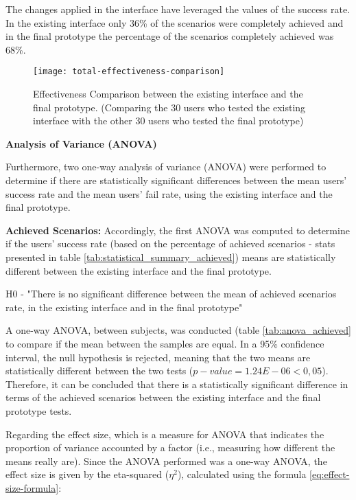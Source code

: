 The changes applied in the interface have leveraged the values of the success rate. In the existing interface only 36\% of the scenarios were completely achieved and in the final prototype the percentage of the scenarios completely achieved was 68\%.

\begin{figure}[htbp]
	\centering
	\texttt{[image: total-effectiveness-comparison]}
	\caption{Effectiveness Comparison between the existing interface and the final prototype. (Comparing the 30 users who tested the existing interface with the other 30 users who tested the final prototype)}
	\label{fig:totalEffectivenessComparison}
\end{figure}

\medskip

\textbf{Analysis of Variance (ANOVA)}

\medskip

Furthermore, two one-way analysis of variance (ANOVA) were performed to determine if there are statistically significant differences between the mean users' success rate and the mean users' fail rate, using the existing interface and the final prototype.

\textbf{Achieved Scenarios:} Accordingly, the first ANOVA was computed to determine if the users' success rate (based on the percentage of achieved scenarios - stats presented in table \ref{tab:statistical_summary_achieved}) means are statistically different between the existing interface and the final prototype.

\begin{center}
  H0 - "There is no significant difference between the mean of achieved scenarios rate, in the existing interface and in the final prototype"
\end{center}

A one-way ANOVA, between subjects, was conducted (table \ref{tab:anova_achieved} to compare if the mean between the samples are equal. In a 95\% confidence interval, the null hypothesis is rejected, meaning that the two means are statistically different between the two tests ($p-value = 1.24E-06 < 0,05$). Therefore, it can be concluded that there is a statistically significant difference in terms of the achieved scenarios between the existing interface and the final prototype tests.

Regarding the effect size, which is a measure for ANOVA that indicates the proportion of variance accounted by a factor (i.e., measuring how different the means really are). Since the ANOVA performed was a one-way ANOVA, the effect size is given by the eta-squared ($\eta^2$), calculated using the formula \ref{eq:effect-size-formula}:

